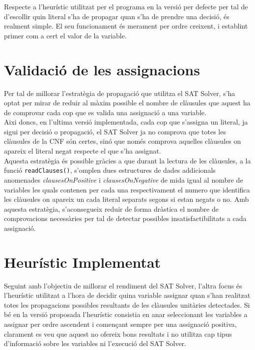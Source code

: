 Respecte a l'heurístic utilitzat per el programa en la versió per defecte per tal de d'escollir quin literal s'ha de propagar quan s'ha de prendre una decisió, és realment simple. El seu funcionament és merament per ordre creixent, i establint primer com a cert el valor de la variable.

\section{Validació de les assignacions}
Per tal de millorar l'estratègia de propagació que utilitza el SAT Solver, s'ha optat per mirar de reduir al màxim possible el nombre de clàusules que aquest ha de comprovar cada cop que es valida una assignació a una variable.\\
Aixi doncs, en l'ultima versió implementada, cada cop que s'assigna un literal, ja sigui per decisió o propagació, el SAT Solver ja no comprova que totes les clàusules de la CNF són certes, sinó que només comprova aquelles clàusules on apareix el literal negat respecte el que s'ha assignat.\\

Aquesta estratègia és possible gràcies a que durant la lectura de les clàusules, a la funció \texttt{readClauses()}, s'omplen dues estructures de dades addicionals anomenades \textit{clausesOnPositive} i \textit{clausesOnNegative} de mida igual al nombre de variables  les quals contenen per cada una respectivament el numero que identifica les clàusules on apareix un cada literal separats segons si estan negats o no. Amb aquesta estratègia, s'aconsegueix reduir de forma dràstica el nombre de comprovacions necessàries per tal de detectar possibles insatisfactibilitats a cada assignació.

\section{Heurístic Implementat}
Seguint amb l'objectiu de millorar el rendiment del SAT Solver, l'altra focus és l'heurístic utilitzat a l'hora de decidir quina variable assignar quan s'han realitzat totes les propagacions possibles resultants de les clàusules unitàries detectades. Si bé en la versió proposada l'heurístic consistia en anar seleccionant les variables a assignar per ordre ascendent i començant sempre per una assignació positiva, clarament es veu que aquest no ofereix bons resultats i no utilitza cap tipus d'informació sobre les variables ni l'execució del SAT Solver.\\

